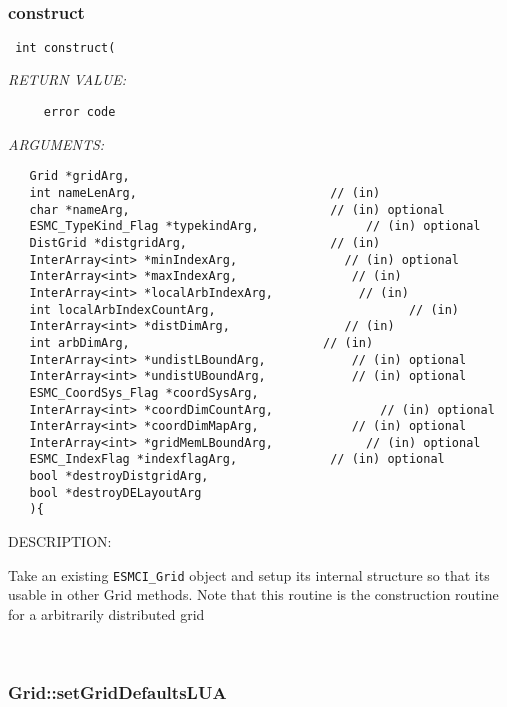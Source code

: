 \mbox{}\hrulefill\ 
 
\subsubsection [construct] {construct}


  
\begin{verbatim} int construct(\end{verbatim}{\em RETURN VALUE:}
\begin{verbatim}     error code\end{verbatim}{\em ARGUMENTS:}
\begin{verbatim}   Grid *gridArg, 
   int nameLenArg,                           // (in)
   char *nameArg,                            // (in) optional
   ESMC_TypeKind_Flag *typekindArg,               // (in) optional
   DistGrid *distgridArg,                    // (in) 
   InterArray<int> *minIndexArg,               // (in) optional
   InterArray<int> *maxIndexArg,                // (in)  
   InterArray<int> *localArbIndexArg,            // (in)  
   int localArbIndexCountArg,                           // (in)  
   InterArray<int> *distDimArg,                // (in) 
   int arbDimArg,                           // (in)
   InterArray<int> *undistLBoundArg,            // (in) optional
   InterArray<int> *undistUBoundArg,            // (in) optional
   ESMC_CoordSys_Flag *coordSysArg, 
   InterArray<int> *coordDimCountArg,               // (in) optional
   InterArray<int> *coordDimMapArg,             // (in) optional
   InterArray<int> *gridMemLBoundArg,             // (in) optional
   ESMC_IndexFlag *indexflagArg,             // (in) optional
   bool *destroyDistgridArg,
   bool *destroyDELayoutArg
   ){\end{verbatim}
{\sf DESCRIPTION:\\ }


     Take an existing {\tt ESMCI_Grid} object and setup its internal structure
     so that its usable in other Grid methods. Note that this routine
     is the construction routine for a arbitrarily distributed grid 
 
\mbox{}\hrulefill\
 
\subsubsection [Grid::setGridDefaultsLUA] {Grid::setGridDefaultsLUA}


